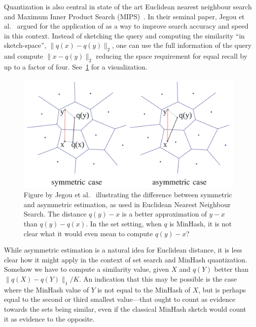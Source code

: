 Quantization is also central in state of the art Euclidean nearest neighbour search and Maximum Inner Product Search (MIPS)~\cite{guo2020accelerating}.
In their seminal paper, Jegou et al.~\cite{jegou2010product}
argued for the application of  as a way to improve search accuracy and speed in this context.
Instead of sketching the query and computing the similarity ``in sketch-space'', $\|q(x)-q(y)\|_2$,
one can use the full information of the query and compute $\|x-q(y)\|_2$ reducing the space requirement for equal recall by up to a factor of four.
See~\cref{fig:jegou} for a visualization.

\begin{figure}
   \centering
   \includegraphics[width=\linewidth]{figures/pq}
\caption{Figure by Jegou et al.~\cite{jegou2010product} illustrating the difference between symmetric and asymmetric estimation, as used in Euclidean Nearest Neighbour Search.
   The distance $q(y)-x$ is a better approximation of $y-x$ than $q(y)-q(x)$.
   In the set setting, when $q$ is MinHash, it is not clear what it would even mean to compute $q(y)-x$?
}
   \label{fig:jegou}
\end{figure}


While asymmetric estimation is a natural idea for Euclidean distance, it is less clear how it might apply in the context of set search and MinHash quantization.
Somehow we have to compute a similarity value, given $X$ and $q(Y)$ better than $\|q(X)-q(Y)\|_1/K$.
An indication that this may be possible is the case where the MinHash value of $Y$ is not equal to the MinHash of $X$, but is perhaps equal to the second or third smallest value---that ought to count as evidence towards the sets being similar, even if the classical MinHash sketch would count it as evidence to the opposite.

